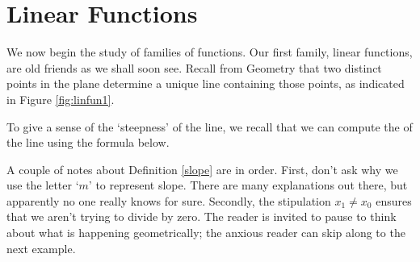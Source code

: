 \section{Linear Functions}

\label{LinearFunctions}

We now begin the study of families of functions.  Our first family, linear functions, are old friends as we shall soon see.  Recall from Geometry that two distinct points in the plane determine a unique line containing those points, as indicated in Figure \ref{fig:linfun1}.


To give a sense of the `steepness' of the line, we recall that we can compute the  of the line using the formula below.

\smallskip


\smallskip

A couple of notes about Definition \ref{slope} are in order.  First, don't ask why we use the letter `$m$' to represent slope.  There are many explanations out there, but apparently no one really knows for sure. Secondly, the stipulation  $x_{1} \neq x_{0}$ ensures that we aren't trying to divide by zero.  The reader is invited to pause to think about what is happening geometrically; the anxious reader can skip along to the next example.


\medskip

